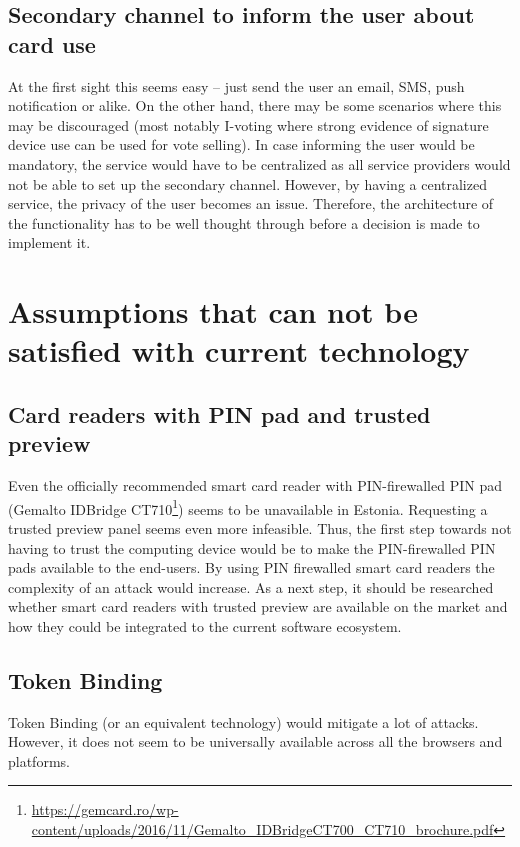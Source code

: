 \subsection{Secondary channel to inform the user about card use}
At the first sight this seems easy -- just send the user an email, SMS, push notification or alike. On the other hand, there may be some scenarios where this may be discouraged (most notably I-voting where strong evidence of signature device use can be used for vote selling). In case informing the user would be mandatory, the service would have to be centralized as all service providers would not be able to set up the secondary channel. However, by having a centralized service, the privacy of the user becomes an issue. Therefore, the architecture of the functionality has to be well thought through before a decision is made to implement it.








\newpage
\section{Assumptions that can not be satisfied with current technology}
\label{sec:unsatisfiable_assumptions}


\subsection{Card readers with PIN pad and trusted preview}

Even the officially recommended smart card reader with PIN-firewalled PIN pad (Gemalto IDBridge CT710\footnote{\url{https://gemcard.ro/wp-content/uploads/2016/11/Gemalto_IDBridgeCT700_CT710_brochure.pdf}}) seems to be unavailable in Estonia. Requesting a trusted preview panel seems even more infeasible. Thus, the first step towards not having to trust the computing device would be to make the PIN-firewalled PIN pads available to the end-users. By using PIN firewalled smart card readers the complexity of an attack would increase. As a next step, it should be researched whether smart card readers with trusted preview are available on the market and how they could be integrated to the current software ecosystem.

\subsection{Token Binding}
Token Binding (or an equivalent technology) would mitigate a lot of attacks. However, it does not seem to be universally available across all the browsers and platforms.

